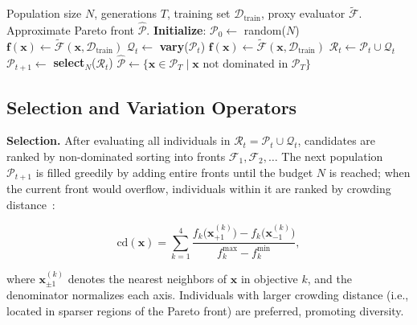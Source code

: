 \documentclass[journal]{IEEEtran}
\newcommand{\calX}{\mathcal{X}}
\begin{document}
\begin{algorithm}
\caption{Joint NAS+QAT Search via NSGA-II}
\label{alg:nsga2}
\begin{algorithmic}[1]
\REQUIRE Population size $N$, generations $T$,
  training set $\mathcal{D}_{\mathrm{train}}$, proxy evaluator $\tilde{\mathcal{F}}$.
\ENSURE Approximate Pareto front $\hat{\mathcal{P}}$.
\STATE \textbf{Initialize}: $\mathcal{P}_0 \leftarrow$ random($N$) \COMMENT{uniform over $\calX$}
    \STATE $\bm{f}(\bm{x}) \leftarrow \tilde{\mathcal{F}}(\bm{x}, \mathcal{D}_{\mathrm{train}})$
  \ENDFOR
  \STATE $\mathcal{Q}_t \leftarrow$ \textbf{vary}($\mathcal{P}_t$)
    \STATE $\bm{f}(\bm{x}) \leftarrow \tilde{\mathcal{F}}(\bm{x}, \mathcal{D}_{\mathrm{train}})$
  \ENDFOR
  \STATE $\mathcal{R}_t \leftarrow \mathcal{P}_t \cup \mathcal{Q}_t$
  \STATE $\mathcal{P}_{t+1} \leftarrow$ \textbf{select}$_N$($\mathcal{R}_t$)
\ENDFOR
\STATE $\hat{\mathcal{P}} \leftarrow \{\bm{x} \in \mathcal{P}_T \mid \bm{x} \text{ not dominated in } \mathcal{P}_T\}$
\end{algorithmic}
\end{algorithm}

\subsection{Selection and Variation Operators}

\textbf{Selection.}
After evaluating all individuals in $\mathcal{R}_t = \mathcal{P}_t \cup \mathcal{Q}_t$,
candidates are ranked by non-dominated sorting into fronts
$\mathcal{F}_1, \mathcal{F}_2, \ldots$
The next population $\mathcal{P}_{t+1}$ is filled greedily by adding entire
fronts until the budget $N$ is reached; when the current front would overflow,
individuals within it are ranked by crowding distance~\cite{deb2002fast}:

\begin{equation}
\mathrm{cd}(\bm{x}) = \sum_{k=1}^{4}
\frac{f_k\bigl(\bm{x}^{(k)}_{+1}\bigr) - f_k\bigl(\bm{x}^{(k)}_{-1}\bigr)}
     {f_k^{\max} - f_k^{\min}},
\label{eq:cd}
\end{equation}

where $\bm{x}^{(k)}_{\pm 1}$ denotes the nearest neighbors of $\bm{x}$ in
objective $k$, and the denominator normalizes each axis.
Individuals with larger crowding distance (i.e., located in sparser regions of
the Pareto front) are preferred, promoting diversity.
\end{document}
